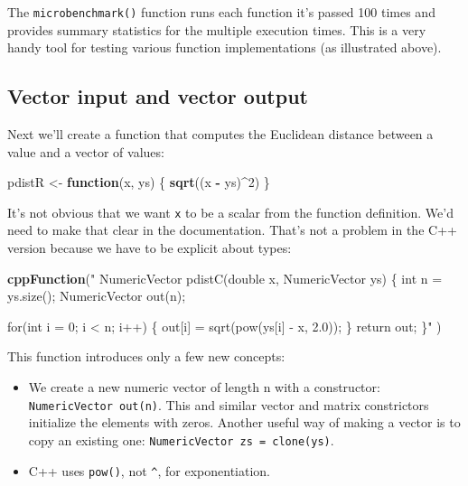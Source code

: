 \documentclass[
]{krantz}
\makeatletter
\newenvironment{Shaded}{\begin{snugshade}}{\end{snugshade}}
\newcommand{\ControlFlowTok}[1]{\textcolor[rgb]{0.27,0.27,0.27}{\textbf{#1}}}
\newcommand{\DecValTok}[1]{\textcolor[rgb]{0.06,0.06,0.06}{#1}}
\newcommand{\KeywordTok}[1]{\textcolor[rgb]{0.27,0.27,0.27}{\textbf{#1}}}
\newcommand{\NormalTok}[1]{#1}
\newcommand{\OperatorTok}[1]{\textcolor[rgb]{0.43,0.43,0.43}{\textbf{#1}}}
\newcommand{\StringTok}[1]{\textcolor[rgb]{0.5,0.5,0.5}{#1}}
\providecommand{\tightlist}{%
  \setlength{\itemsep}{0pt}\setlength{\parskip}{0pt}}
\newenvironment{kframe}{%
\medskip{}
\setlength{\fboxsep}{.8em}
 \def\at@end@of@kframe{}%
 \ifinner\ifhmode%
  \def\at@end@of@kframe{\end{minipage}}%
  \begin{minipage}{\columnwidth}%
 \fi\fi%
 \def\FrameCommand##1{\hskip\@totalleftmargin \hskip-\fboxsep
 \colorbox{shadecolor}{##1}\hskip-\fboxsep
     \hskip-\linewidth \hskip-\@totalleftmargin \hskip\columnwidth}%
 \MakeFramed {\advance\hsize-\width
   \@totalleftmargin\z@ \linewidth\hsize
   \@setminipage}}%
 {\par\unskip\endMakeFramed%
 \at@end@of@kframe}
\renewenvironment{Shaded}{\begin{kframe}}{\end{kframe}}
\makeatother
\begin{document}
The \texttt{microbenchmark()} function runs each function it's passed 100 times and provides summary statistics for the multiple execution times. This is a very handy tool for testing various function implementations (as illustrated above).

\hypertarget{vector-input-and-vector-output}{%
\subsection{Vector input and vector output}\label{vector-input-and-vector-output}}

Next we'll create a function that computes the Euclidean distance between a value and a vector of values:

\begin{Shaded}
\begin{Highlighting}[]
\NormalTok{pdistR \textless{}{-}}\StringTok{ }\ControlFlowTok{function}\NormalTok{(x, ys) \{}
    \KeywordTok{sqrt}\NormalTok{((x }\OperatorTok{{-}}\StringTok{ }\NormalTok{ys)}\OperatorTok{\^{}}\DecValTok{2}\NormalTok{)}
\NormalTok{\}}
\end{Highlighting}
\end{Shaded}

It's not obvious that we want \texttt{x} to be a scalar from the function definition. We'd need to make that clear in the documentation. That's not a problem in the C++ version because we have to be explicit about types:

\begin{Shaded}
\begin{Highlighting}[]
\KeywordTok{cppFunction}\NormalTok{(}\StringTok{"}
\StringTok{  NumericVector pdistC(double x, NumericVector ys) \{}
\StringTok{    int n = ys.size();}
\StringTok{    NumericVector out(n);}

\StringTok{    for(int i = 0; i \textless{} n; i++) \{}
\StringTok{      out[i] = sqrt(pow(ys[i] {-} x, 2.0));}
\StringTok{    \}}
\StringTok{    return out;}
\StringTok{  \}"}
\NormalTok{)}
\end{Highlighting}
\end{Shaded}

This function introduces only a few new concepts:

\begin{itemize}
\tightlist
\item
  We create a new numeric vector of length n with a constructor: \texttt{NumericVector\ out(n)}. This and similar vector and matrix constrictors initialize the elements with zeros. Another useful way of making a vector is to copy an existing one: \texttt{NumericVector\ zs\ =\ clone(ys)}.
\item
  C++ uses \texttt{pow()}, not \texttt{\^{}}, for exponentiation.
\end{itemize}
\end{document}

